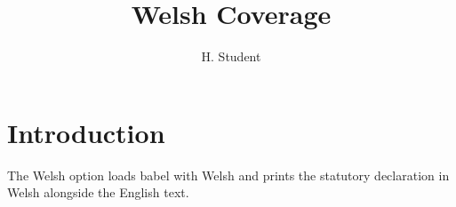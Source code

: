 \documentclass[phd,welsh,12pt,a4paper]{bangor}
\title{Welsh Coverage}
\author{H. Student}
\begin{document}
\maketitle
\statementspage
\chapter{Introduction}
The Welsh option loads babel with Welsh and prints the statutory
declaration in Welsh alongside the English text.
\end{document}
